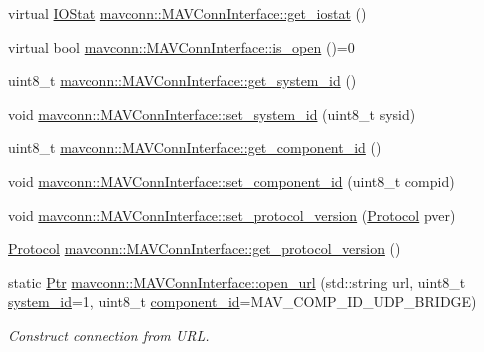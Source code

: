 \begin{DoxyCompactItemize}
\item 
virtual \mbox{\hyperlink{structmavconn_1_1MAVConnInterface_1_1IOStat}{I\+O\+Stat}} \mbox{\hyperlink{group__mavconn_gab330e130b5cff0e1d6aa67742ffc79f4}{mavconn\+::\+M\+A\+V\+Conn\+Interface\+::get\+\_\+iostat}} ()
\item 
virtual bool \mbox{\hyperlink{group__mavconn_ga135638c7c953c50bee3143a9e2b35416}{mavconn\+::\+M\+A\+V\+Conn\+Interface\+::is\+\_\+open}} ()=0
\item 
uint8\+\_\+t \mbox{\hyperlink{group__mavconn_gac09eda5df4b4b82823429d9af6dddd44}{mavconn\+::\+M\+A\+V\+Conn\+Interface\+::get\+\_\+system\+\_\+id}} ()
\item 
void \mbox{\hyperlink{group__mavconn_gaf2828d99a65c8e631566e7fd564abac3}{mavconn\+::\+M\+A\+V\+Conn\+Interface\+::set\+\_\+system\+\_\+id}} (uint8\+\_\+t sysid)
\item 
uint8\+\_\+t \mbox{\hyperlink{group__mavconn_gada7ecc7f6cffa0ecfc17f88327953223}{mavconn\+::\+M\+A\+V\+Conn\+Interface\+::get\+\_\+component\+\_\+id}} ()
\item 
void \mbox{\hyperlink{group__mavconn_gac3e7c34cdb6e8104959654ff49bd2497}{mavconn\+::\+M\+A\+V\+Conn\+Interface\+::set\+\_\+component\+\_\+id}} (uint8\+\_\+t compid)
\item 
void \mbox{\hyperlink{group__mavconn_gae78b30f23f5f1a94684761f7ddc0d2e2}{mavconn\+::\+M\+A\+V\+Conn\+Interface\+::set\+\_\+protocol\+\_\+version}} (\mbox{\hyperlink{group__mavconn_gae4e5498ebfd232dcad75be0f8a168ff3}{Protocol}} pver)
\item 
\mbox{\hyperlink{group__mavconn_gae4e5498ebfd232dcad75be0f8a168ff3}{Protocol}} \mbox{\hyperlink{group__mavconn_gaae320aaf19ca5b0c03b6febba5efdf1b}{mavconn\+::\+M\+A\+V\+Conn\+Interface\+::get\+\_\+protocol\+\_\+version}} ()
\item 
static \mbox{\hyperlink{group__mavconn_gaff41078b805e1d8f85ed6fd2d87711ce}{Ptr}} \mbox{\hyperlink{group__mavconn_gad7b5a25103f1421a63839a1aa0f080dc}{mavconn\+::\+M\+A\+V\+Conn\+Interface\+::open\+\_\+url}} (std\+::string url, uint8\+\_\+t \mbox{\hyperlink{setHome_8cpp_a83150acb88d810ae6864b4c125324ed6}{system\+\_\+id}}=1, uint8\+\_\+t \mbox{\hyperlink{setHome_8cpp_adc84285d5da2c4fa9721d0a32d5e41a7}{component\+\_\+id}}=M\+A\+V\+\_\+\+C\+O\+M\+P\+\_\+\+I\+D\+\_\+\+U\+D\+P\+\_\+\+B\+R\+I\+D\+GE)
\begin{DoxyCompactList}\small\item\em Construct connection from U\+RL. \end{DoxyCompactList}\item 

\end{DoxyCompactItemize}
